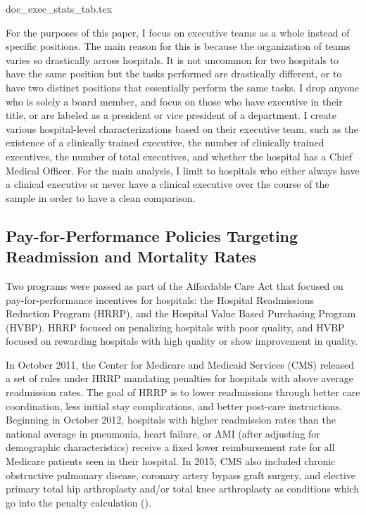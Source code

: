 \documentclass[12pt]{article}
\begin{document}
    {doc_exec_stats_tab.tex}

    For the purposes of this paper, I focus on executive teams as a whole instead of specific positions. The main reason for this is because the organization of teams varies so drastically across hospitals. It is not uncommon for two hospitals to have the same position but the tasks performed are drastically different, or to have two distinct positions that essentially perform the same tasks. I drop anyone who is solely a board member, and focus on those who have executive in their title, or are labeled as a president or vice president of a department. I create various hospital-level characterizations based on their executive team, such as the existence of a clinically trained executive, the number of clinically trained executives, the number of total executives, and whether the hospital has a Chief Medical Officer. For the main analysis, I limit to hospitals who either always have a clinical executive or never have a clinical executive over the course of the sample in order to have a clean comparison.
  
    \subsection{Pay-for-Performance Policies Targeting Readmission and Mortality Rates}\label{sec:hrrp}

    Two programs were passed as part of the Affordable Care Act that focused on pay-for-performance incentives for hospitals: the Hospital Readmissions Reduction Program (HRRP), and the Hospital Value Based Purchasing Program (HVBP). HRRP focused on penalizing hospitals with poor quality, and HVBP focused on rewarding hospitals with high quality or show improvement in quality. 

    In October 2011, the Center for Medicare and Medicaid Services (CMS) released a set of rules under HRRP mandating penalties for hospitals with above average readmission rates. The goal of HRRP is to lower readmissions through better care coordination, less initial stay complications, and better post-care instructions. Beginning in October 2012, hospitals with higher readmission rates than the national average in pneumonia, heart failure, or AMI (after adjusting for demographic characteristics) receive a fixed lower reimbursement rate for all Medicare patients seen in their hospital. In 2015, CMS also included chronic obstructive pulmonary disease, coronary artery bypass graft surgery, and elective primary total hip arthroplasty and/or total knee arthroplasty as conditions which go into the penalty calculation (\cite{CMS}). 
    
\end{document}
